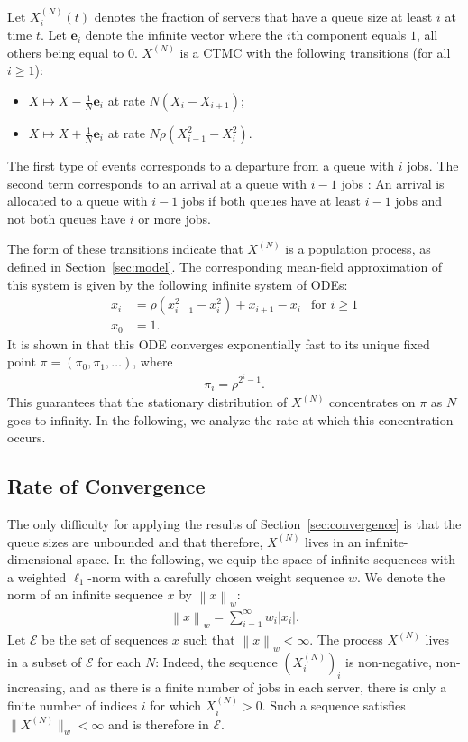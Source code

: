 \documentclass[sigconf]{acmart}
\newcommand\XN{X^{(N)}}
\newcommand\E{\mathcal{E}}
\newcommand\norm[1]{\left\|#1\right\|}
\newcommand\snorm[1]{\|#1\|}
\newcommand\abs[1]{\left|#1\right|}
\begin{document}
Let $\XN_i(t)$ denotes the fraction of servers that have a queue size
at least $i$ at time $t$. Let $\mathbf{e}_i$ denote the infinite
vector where the $i$th component equals $1$, all others being equal to
$0$.  $\XN$ is a CTMC with the following transitions (for all
$i\ge1$):
\begin{itemize}
\item $X \mapsto X-\frac{1}{N}\mathbf{e}_i$ at rate $N(X_{i}-X_{i+1})$;
\item $X \mapsto X+\frac1N\mathbf{e}_i$ at rate
  $N\rho(X^2_{i-1}-X^2_{i})$.
\end{itemize}
The first type of events corresponds to a departure from a queue with
$i$ jobs. The second term corresponds to an arrival at a queue with
$i-1$ jobs : An arrival is allocated to a queue with $i-1$ jobs if
both queues have at least $i-1$ jobs and not both queues have $i$ or
more jobs.

The form of these transitions indicate that $\XN$ is a population
process, as defined in Section~\ref{sec:model}. The corresponding
mean-field approximation of this system is given by the following
infinite system of ODEs:
\begin{align*}
  \dot{x}_i &= \rho(x^2_{i-1}-x_i^2) + x_{i+1}-x_{i}
  &\text{for $i\ge1$}\\
  x_0 &= 1.
\end{align*}
It is shown in \cite{mitzenmacher1996power} that this ODE converges
exponentially fast to its unique fixed point
$\pi=(\pi_0,\pi_1,\dots)$, where
\begin{align*}
  \pi_{i} = \rho^{2^i-1}.  
\end{align*}
This guarantees that the stationary distribution of $\XN$ concentrates
on $\pi$ as $N$ goes to infinity.  In the following, we analyze the
rate at which this concentration occurs. 


\subsection{Rate of Convergence} 

The only difficulty for applying the results of
Section~\ref{sec:convergence} is that the queue sizes are unbounded
and that therefore, $\XN$ lives in an infinite-dimensional space. In
the following, we equip the space of infinite sequences with a
weighted $\ell_1$-norm with a carefully chosen weight sequence $w$. We
denote the norm of an infinite sequence $x$ by $\norm{x}_w$:
\begin{align*}
  \norm{x}_w=\sum_{i=1}^\infty w_i\abs{x_i}.
\end{align*}
Let $\E$ be the set of sequences $x$ such that $\norm{x}_w<\infty$.
The process $\XN$ lives in a subset of $\E$ for each $N$: Indeed, the
sequence $(\XN_i)_i$ is non-negative, non-increasing, and as there is
a finite number of jobs in each server, there is only a finite number
of indices $i$ for which $\XN_i>0$. Such a sequence satisfies
$\snorm{\XN}_w<\infty$ and is therefore in $\E$.
\end{document}
